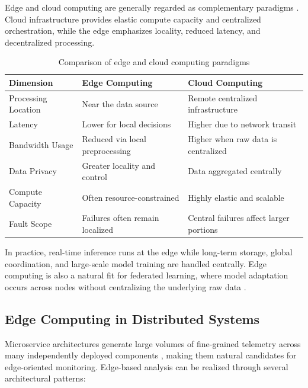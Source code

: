 Edge and cloud computing are generally regarded as complementary paradigms
\cite{shi2016edge, deng2016optimal}. Cloud infrastructure provides elastic compute
capacity and centralized orchestration, while the edge emphasizes locality, reduced
latency, and decentralized processing.

\begin{table}[H]
    \centering
    \begin{tabular}{|p{}|p{}|p{}|}
        \hline
        \textbf{Dimension} & \textbf{Edge Computing} & \textbf{Cloud Computing} \\
        \hline
        Processing Location & Near the data source & Remote centralized infrastructure \\
        \hline
        Latency & Lower for local decisions & Higher due to network transit \\
        \hline
        Bandwidth Usage & Reduced via local preprocessing & Higher when raw data is centralized \\
        \hline
        Data Privacy & Greater locality and control & Data aggregated centrally \\
        \hline
        Compute Capacity & Often resource-constrained & Highly elastic and scalable \\
        \hline
        Fault Scope & Failures often remain localized & Central failures affect larger portions \\
        \hline
    \end{tabular}
    \caption{Comparison of edge and cloud computing paradigms}
    \label{tab:edge_vs_cloud}
\end{table}

In practice, real-time inference runs at the edge while long-term storage, global
coordination, and large-scale model training are handled centrally. Edge computing is
also a natural fit for federated learning, where model adaptation occurs across nodes
without centralizing the underlying raw data \cite{mcmahan2017communication,
kairouz2021advances}.

\subsection{Edge Computing in Distributed Systems}
\label{subsec:edge_in_ds}

Microservice architectures generate large volumes of fine-grained telemetry across many
independently deployed components \cite{burns2016borg, newman2021building,
dragoni2017microservices}, making them natural candidates for edge-oriented monitoring.
Edge-based analysis can be realized through several architectural patterns:

